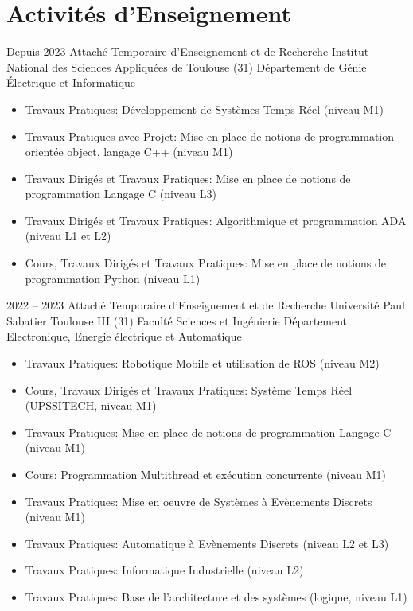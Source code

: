 \documentclass[11pt,a4paper,sans]{moderncv}         %
\begin{document}
\section{Activit\'es d'Enseignement}
\cventry
{Depuis 2023}
{Attach\'e Temporaire d'Enseignement et de Recherche}
{Institut National des Sciences Appliqu\'ees de Toulouse (31)}
{D\'epartement de G\'enie \'Electrique et Informatique}
{}
{
\begin{itemize}
  \item Travaux Pratiques: D\'eveloppement de Syst\`emes Temps R\'eel (niveau M1)
  \item Travaux Pratiques avec Projet: Mise en place de notions de programmation orient\'ee object, langage C++ (niveau M1)
  \item Travaux Dirig\'es et Travaux Pratiques: Mise en place de notions de programmation Langage C (niveau L3)
  \item Travaux Dirig\'es et Travaux Pratiques: Algorithmique et programmation ADA (niveau L1 et L2)
  \item Cours, Travaux Dirig\'es et Travaux Pratiques: Mise en place de notions de programmation Python (niveau L1)
\end{itemize}
}
%
\cventry
{2022 -- 2023}
{Attach\'e Temporaire d'Enseignement et de Recherche}
{Universit\'e Paul Sabatier Toulouse III (31)}
{Facult\'e Sciences et Ing\'enierie}
{D\'epartement Electronique, Energie \'electrique et Automatique}
{
\begin{itemize}
  \item Travaux Pratiques: Robotique Mobile et utilisation de ROS (niveau M2)
  \item Cours, Travaux Dirig\'es et Travaux Pratiques: Syst\`eme Temps R\'eel (UPSSITECH, niveau M1)
  \item Travaux Pratiques: Mise en place de notions de programmation Langage C (niveau M1)
  \item Cours: Programmation Multithread et ex\'ecution concurrente (niveau M1)
  \item Travaux Pratiques: Mise en oeuvre de Syst\`emes \`a Ev\`enements Discrets (niveau M1)
  \item Travaux Pratiques: Automatique \`a Ev\`enements Discrets (niveau L2 et L3)
  \item Travaux Pratiques: Informatique Industrielle (niveau L2)
  \item Travaux Pratiques: Base de l'architecture et des syst\`emes (logique, niveau L1)
\end{itemize}
}
%
\cventry
\end{document}
